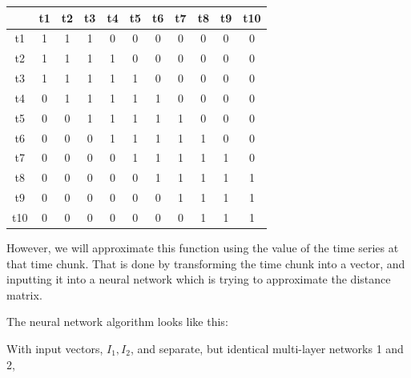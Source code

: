\documentclass{article}
\begin{document}
\begin{tabular}{|c|c|c|c|c|c|c|c|c|c|c|}
	\hline 
	& t1 & t2 & t3 & t4 & t5 & t6 & t7 & t8 & t9 & t10\\ \hline 
	t1 & 1 & 1 & 1 & 0 & 0 & 0 & 0 & 0 & 0 & 0\\ \hline 
	t2 & 1 & 1 & 1 & 1 & 0 & 0 & 0 & 0 & 0 & 0\\ \hline 
	t3 & 1 & 1 & 1 & 1 & 1 & 0 & 0 & 0 & 0 & 0\\ \hline 
	t4 & 0 & 1 & 1 & 1 & 1 & 1 & 0 & 0 & 0 & 0\\ \hline 
	t5 & 0 & 0 & 1 & 1 & 1 & 1 & 1 & 0 & 0 & 0\\ \hline 
	t6 & 0 & 0 & 0 & 1 & 1 & 1 & 1 & 1 & 0 & 0\\ \hline 
	t7 & 0 & 0 & 0 & 0 & 1 & 1 & 1 & 1 & 1 & 0\\ \hline 
	t8 & 0 & 0 & 0 & 0 & 0 & 1 & 1 & 1 & 1 & 1\\ \hline 
	t9 & 0 & 0 & 0 & 0 & 0 & 0 & 1 & 1 & 1 & 1\\ \hline 
	t10 & 0 & 0 & 0 & 0 & 0 & 0 & 0 & 1 & 1 & 1\\ \hline 
\end{tabular}

However, we will approximate this function using the value of the time series at that time chunk. That is done by transforming the time chunk into a vector, and inputting it into a neural network which is trying to approximate the distance matrix. 

The neural network algorithm looks like this:

With input vectors, $I_1, I_2$, and separate, but identical multi-layer networks 1 and 2, 	


\end{document}
